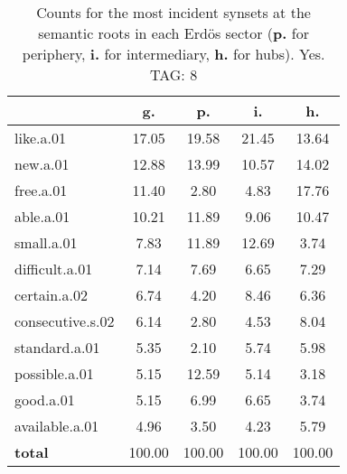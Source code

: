 \begin{table}[h!]
\begin{center}
\begin{tabular}{| l | c | c | c | c |}\hline
 & g. & p. & i. & h. \\\hline
like.a.01 & 17.05  & 19.58  & 21.45  & 13.64 \\\hline
new.a.01 & 12.88  & 13.99  & 10.57  & 14.02 \\\hline
free.a.01 & 11.40  & 2.80  & 4.83  & 17.76 \\\hline
able.a.01 & 10.21  & 11.89  & 9.06  & 10.47 \\\hline
small.a.01 & 7.83  & 11.89  & 12.69  & 3.74 \\\hline
difficult.a.01 & 7.14  & 7.69  & 6.65  & 7.29 \\\hline
certain.a.02 & 6.74  & 4.20  & 8.46  & 6.36 \\\hline
consecutive.s.02 & 6.14  & 2.80  & 4.53  & 8.04 \\\hline
standard.a.01 & 5.35  & 2.10  & 5.74  & 5.98 \\\hline
possible.a.01 & 5.15  & 12.59  & 5.14  & 3.18 \\\hline
good.a.01 & 5.15  & 6.99  & 6.65  & 3.74 \\\hline
available.a.01 & 4.96  & 3.50  & 4.23  & 5.79 \\\hline
{{\bf total}} & 100.00  & 100.00  & 100.00  & 100.00 \\\hline
\end{tabular}
\caption{Counts for the most incident synsets at the semantic roots in each Erd\"os sector ({\bf p.} for periphery, {\bf i.} for intermediary, {\bf h.} for hubs). Yes. TAG: 8}
\end{center}
\end{table}